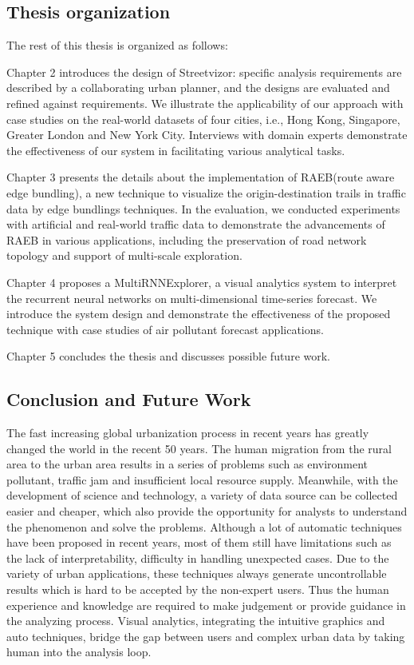 \subsection{Thesis organization}


The rest of this thesis is organized as follows:

Chapter 2 introduces the design of Streetvizor: specific analysis requirements are described by a collaborating urban planner, and the designs are evaluated and refined against requirements. We illustrate the applicability of our approach with case studies on the real-world datasets of four cities, i.e., Hong Kong, Singapore, Greater London and New York City. Interviews with domain experts demonstrate the effectiveness of our system in facilitating various analytical tasks.

Chapter 3 presents the details about the implementation of RAEB(route aware edge bundling), a new technique to visualize the origin-destination trails in traffic data by edge bundlings techniques. In the evaluation, we conducted experiments with artificial and real-world traffic data to demonstrate the advancements of RAEB in various applications, including the preservation of road network topology and support of multi-scale exploration. 

Chapter 4 proposes a MultiRNNExplorer, a visual analytics system to interpret the recurrent neural networks on multi-dimensional time-series forecast. We introduce the system design and demonstrate the effectiveness of the proposed technique with case studies of air pollutant forecast applications.


Chapter 5 concludes the thesis and discusses possible future work.

\subsection{Conclusion and Future Work}

The fast increasing global urbanization process in recent years has greatly changed the world in the recent 50 years. The human migration from the rural area to the urban area results in a series of problems such as environment pollutant, traffic jam and insufficient local resource supply. Meanwhile, with the development of science and technology, a variety of data source can be collected easier and cheaper, which also provide the opportunity for analysts to understand the phenomenon and solve the problems. Although a lot of automatic techniques have been proposed in recent years, most of them still have limitations such as the lack of interpretability, difficulty in handling unexpected cases. Due to the variety of urban applications, these techniques always generate uncontrollable results which is hard to be accepted by the non-expert users. Thus the human experience and knowledge are required to make judgement or provide guidance in the analyzing process. Visual analytics, integrating the intuitive graphics and auto techniques, bridge the gap between users and complex urban data by taking human into the analysis loop.  

